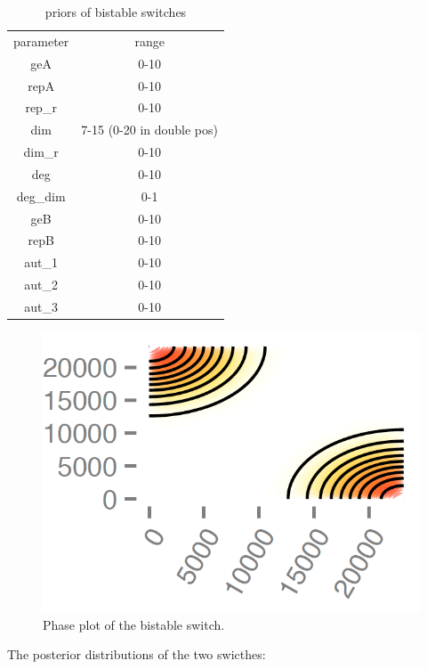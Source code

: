 \begin{table}[htbp]
\centering
\caption{priors of bistable switches}
\label{tab:priors_bi}
\begin{tabular}{cc}
parameter & range \\
geA & 0-10 \\
repA & 0-10 \\
rep\_r & 0-10 \\
dim & 7-15 (0-20 in double pos)\\
dim\_r & 0-10 \\
deg & 0-10 \\
deg\_dim & 0-1 \\
geB & 0-10 \\
repB & 0-10 \\
aut\_1 & 0-10 \\
aut\_2 & 0-10 \\
aut\_3 & 0-10
\end{tabular}
\end{table}

\begin{figure}[htbp]
\begin{center}
\includegraphics[scale=0.2]{chapterStabilityFinder/mass_action_switches/bi_stoch_images/phase_plt.png}
\caption{Phase plot of the bistable switch.}\label{fig_5}
\end{center}
\end{figure}

The posterior distributions of the two swicthes:

